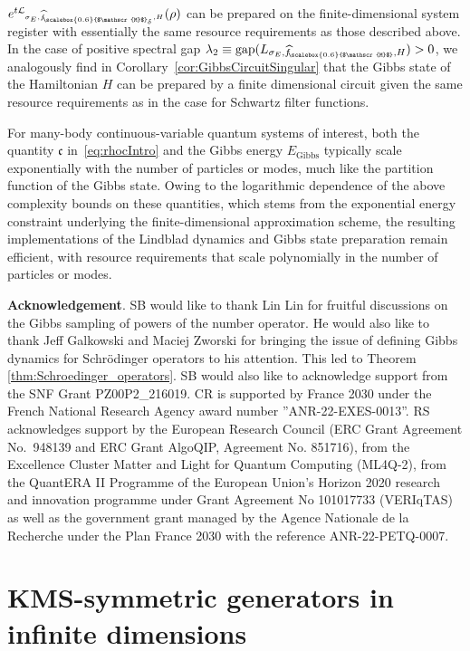 \documentclass[11pt]{amsart}
\def\smallsection#1{\smallskip\noindent\textbf{#1}.}
\newcommand{\1}{\mathbbm{1}}
\newcommand{\hatfM}{\widehat{f}_{\!\scalebox{0.6}{$\mathscr{M}$}}
}
\newcommand{\hatfMdelta}{\widehat{f}_{\!\scalebox{0.6}{$\mathscr{M}$}_\delta}}
\theoremstyle{plain}
\theoremstyle{definition}
\theoremstyle{remark}
\numberwithin{equation}{section}
\begin{document}
$e^{\smash{t\mathcal{L}_{\sigma_E,\hatfMdelta, H}}}(\rho)$
can be prepared on the finite-dimensional system register with essentially the same resource requirements as those described above. In the case of positive spectral gap $\lambda_2\equiv \operatorname{gap}(L_{\smash{\sigma_E,\hatfM,H}})>0$, we analogously find in Corollary~\ref{cor:GibbsCircuitSingular} that the Gibbs state of the Hamiltonian $H$ can be prepared by a finite dimensional circuit given the same resource requirements as in the case for Schwartz filter functions.  

For many-body continuous-variable quantum systems of interest, both the quantity $\mathfrak{c}$ in~\eqref{eq:rhocIntro} and the Gibbs energy $E_{\operatorname{Gibbs}}$ typically scale exponentially with the number of particles or modes, much like the partition function of the Gibbs state. Owing to the logarithmic dependence of the above complexity bounds on these quantities, which stems from the exponential energy constraint underlying the finite-dimensional approximation scheme, the resulting implementations of the Lindblad dynamics and Gibbs state preparation remain efficient, with resource requirements that scale polynomially in the number of particles or modes.



\bigskip

\smallsection{Acknowledgement}
SB would like to thank Lin Lin for fruitful discussions on the Gibbs sampling of powers of the number operator. He would also like to thank Jeff Galkowski and Maciej Zworski for bringing the issue of defining Gibbs dynamics for Schr\"odinger operators to his attention. This led to Theorem \ref{thm:Schroedinger_operators}.
SB would also like to acknowledge support from the SNF Grant PZ00P2\_216019. 
CR is supported by France 2030 under the
French National Research Agency award number ''ANR-22-EXES-0013''. RS acknowledges support by the European Research Council (ERC Grant Agreement No.~948139 and ERC Grant AlgoQIP, Agreement No. 851716), from the Excellence Cluster Matter and Light for Quantum Computing (ML4Q-2), from the QuantERA II Programme of the
European Union’s Horizon 2020 research and innovation programme under Grant Agreement No
101017733 (VERIqTAS) as well as the government grant managed by the Agence Nationale de la
Recherche under the Plan France 2030 with the reference ANR-22-PETQ-0007. 



\section{KMS-symmetric generators in infinite dimensions}\label{sec:generalframe}
\end{document}
